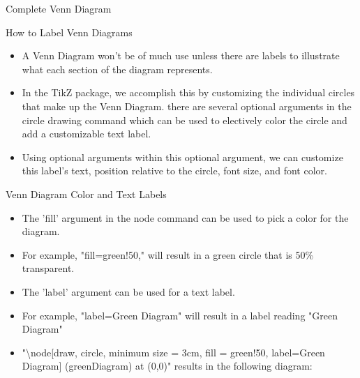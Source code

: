 \documentclass{beamer}
\begin{document}
	\begin{frame}[t,label=frameA] {Complete Venn Diagram}
	\end{frame}
	\begin{frame}[t,label=frameA]{How to Label Venn Diagrams}
		\begin{itemize}
			\item {A Venn Diagram won't be of much use unless there are labels to illustrate what each section of the diagram represents.}
			\item {In the TikZ package, we accomplish this by customizing the individual circles that make up the Venn Diagram. there are several optional arguments in the circle drawing command which can be used to electively color the circle and add a customizable text label.}
			\item {Using optional arguments within this optional argument, we can customize this label's text, position relative to the circle, font size, and font color.}
		\end{itemize}
		
	\end{frame}
	
	
	\begin{frame}[t, label=frameA]{Venn Diagram Color and Text Labels}
		\begin{itemize}
			\item{The 'fill' argument in the node command can be used to pick a color for the diagram.}
			\item{For example, "fill=green!50," will result in a green circle that is 50\% transparent.}
			\item{The 'label' argument can be used for a text label.}
			\item{For example, "label=Green Diagram" will result in a label reading "Green Diagram"}
			\item{\tiny"\textbackslash node[draw, circle, minimum size = 3cm, fill = green!50, label=Green Diagram] (greenDiagram) at (0,0)" \large results in the following diagram:}
		\end{itemize}
	\end{frame}
	
\end{document}
